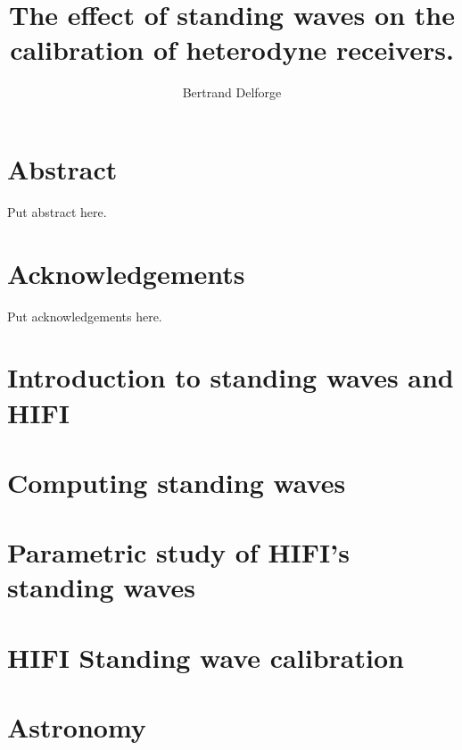 \documentclass[a4paper,11pt]{book}
\title{The effect of standing waves on the calibration of heterodyne receivers.}
\author{Bertrand Delforge}
\begin{document}
\frontmatter
\maketitle
\tableofcontents
\newpage

\listoffigures
\newpage

\clearpage
\chapter{Abstract}
Put abstract here.

\clearpage
\chapter{Acknowledgements}
Put acknowledgements here.
\mainmatter

\cleardoublepage
\chapter{Introduction to standing waves and HIFI}


\cleardoublepage
\chapter{Computing standing waves}


\cleardoublepage
\chapter{Parametric study of HIFI's standing waves}


\cleardoublepage
\chapter{HIFI Standing wave calibration}


\cleardoublepage
\chapter{Astronomy}


\backmatter

\cleardoublepage
{}
\printindex

\cleardoublepage
{}


\end{document}

